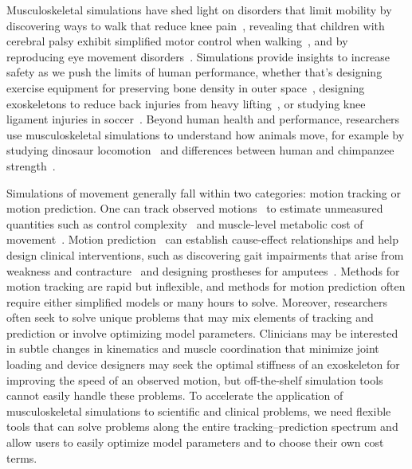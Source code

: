 \documentclass[10pt,letterpaper]{article}
\begin{document}
Musculoskeletal simulations have shed light on disorders that limit mobility by discovering ways to walk that reduce knee pain~\cite{Fregly:2009}, revealing that children with cerebral palsy exhibit simplified motor control when walking~\cite{Steele:2015}, and by reproducing eye movement disorders~\cite{Priamikov:2016}. Simulations provide insights to increase safety as we push the limits of human performance, whether that’s designing exercise equipment for preserving bone density in outer space~\cite{Fregly:2015}, designing exoskeletons to reduce back injuries from heavy lifting~\cite{Manns:2016}, or studying knee ligament injuries in soccer~\cite{Thompson:2017}. Beyond human health and performance, researchers use musculoskeletal simulations to understand how animals move, for example by studying dinosaur locomotion~\cite{sthaya:2005uk} and differences between human and chimpanzee strength~\cite{ONeill:2017}.

Simulations of movement generally fall within two categories: motion tracking or motion prediction. One can track observed motions~\cite{Thelen:2003bba,Lloyd:2003} to estimate unmeasured quantities such as control complexity~\cite{Steele:2015} and muscle-level metabolic cost of movement~\cite{Farris:2014du,Jackson:2017go}. Motion prediction~\cite{Geijtenbeek:2019} can establish cause-effect relationships and help design clinical interventions, such as discovering gait impairments that arise from weakness and contracture~\cite{Ong:2019a} and designing prostheses for amputees~\cite{Handford:2016kd}. Methods for motion tracking are rapid but inflexible, and methods for motion prediction often require either simplified models or many hours to solve. Moreover, researchers often seek to solve unique problems that may mix elements of tracking and prediction or involve optimizing model parameters. Clinicians may be interested in subtle changes in kinematics and muscle coordination that minimize joint loading and device designers may seek the optimal stiffness of an exoskeleton for improving the speed of an observed motion, but off-the-shelf simulation tools cannot easily handle these problems. To accelerate the application of musculoskeletal simulations to scientific and clinical problems, we need flexible tools that can solve problems along the entire tracking–prediction spectrum and allow users to easily optimize model parameters and to choose their own cost terms.
\end{document}
